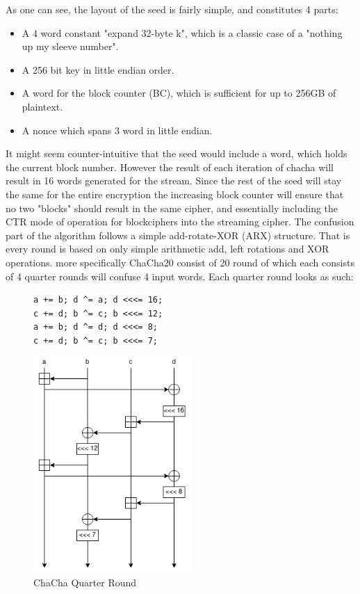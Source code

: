 \documentclass[a4paper]{article}
\begin{document}
As one can see, the layout of the seed is fairly simple, and constitutes 4 parts:
\begin{itemize}
\item A 4 word constant "expand 32-byte k", which is a classic case of a "nothing up my sleeve number".
\item A 256 bit key in little endian order.
\item A word for the block counter (BC), which is sufficient for up to 256GB of plaintext.
\item A nonce which spans 3 word in little endian.
\end{itemize}
It might seem counter-intuitive that the seed would include a word, which holds the current block number. However the result of each iteration of chacha will result in 16 words generated for the stream. Since the rest of the seed will stay the same for the entire encryption the increasing block counter will ensure that no two "blocks" should result in the same cipher, and essentially including the CTR mode of operation for blockciphers into the streaming cipher. The confusion part of the algorithm follows a simple add-rotate-XOR (ARX) structure. That is every round is based on only simple arithmetic add, left rotations and XOR operations. more specifically ChaCha20 consist of 20 round of which each consists of 4 quarter rounds will confuse 4 input words. Each quarter round looks as such:
\begin{figure}[!htb]
\begin{minipage}{0.4\textwidth}
\begin{verbatim}
a += b; d ^= a; d <<<= 16;
c += d; b ^= c; b <<<= 12;
a += b; d ^= d; d <<<= 8;
c += d; b ^= c; b <<<= 7;
\end{verbatim}
\end{minipage}
\qquad
\begin{minipage}{0.4\textwidth}
\includegraphics[width=6cm]{Background/ChaChaQR.png}
\end{minipage}
\caption{ChaCha Quarter Round}
\label{fig:ChaChaQR}
\end{figure}
\end{document}
